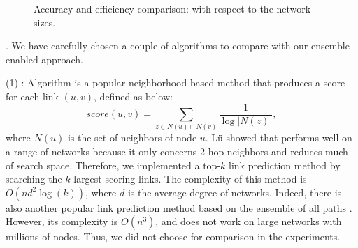 \begin{figure}[tb!]
   \hspace{-2ex}
  \hspace{-2ex}
  \hspace{-2ex}
  \vspace{-1ex}
  \caption{Accuracy and efficiency comparison: with respect to the network sizes.}\label{fig_exp_1_2}
  \vspace{-2ex}
\end{figure}




. We have carefully chosen a couple of algorithms
to compare with our ensemble-enabled approach.


\sstab (1) \Adamic \cite{adamic}: Algorithm \Aa is a popular neighborhood based method that
  produces a score for each link $(u, v)$, defined as below:
  \[ score(u, v) = \sum_{z \in N(u)\cap N(v)}\frac{1}{\log|N(z)|}, \]
  where $N(u)$ is the set of neighbors of node $u$. L\"{u} \cite{linyuan-2011} showed that
  \Aa performs well on a range of networks because it only concerns 2-hop neighbors and
  reduces much of search space. Therefore, we implemented a top-$k$ link prediction
  method by searching the $k$ largest \Aa scoring links. The complexity of this method is
  $O(nd^2\log(k))$, where $d$ is the average degree of networks. Indeed, there is also another popular link
  prediction method \Katz based on the ensemble of all paths \cite{katz-1953}. However, its
  complexity is $O(n^3)$, and does not work on large networks with millions
  of nodes. Thus, we did not choose \Katz for comparison in the experiments.

